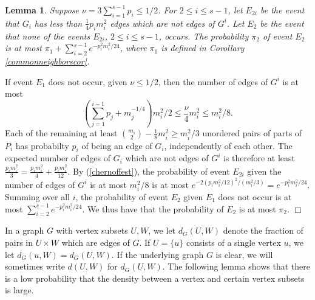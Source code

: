 \documentclass[11pt]{article}
\newtheorem{lemma}{Lemma}[section]
\newenvironment{proof}
      {\medskip\noindent{\bf Proof:}\hspace{1mm}}
      {\hfill$\Box$\medskip}
\begin{document}
\begin{lemma}\label{newedges}
Suppose $\nu= 3\sum_{i=1}^{s-1} p_i \leq 1/2$. For $2 \leq i \leq s-1$, let
$E_{2i}$ be the event that  $G_i$ has less than $\frac{1}{4}p_im_i^2$ edges
which are not edges of $G^i$. Let $E_2$ be the event that none of the events
$E_{2i}$, $2 \leq i \leq s-1$, occurs. The probability $\pi_2$ of event $E_2$
is at most $\pi_1+\sum_{i=2}^{s-1}e^{-p_i^2m_i^2/24}$, where $\pi_1$ is defined
in Corollary \ref{commonneighborscor}.
\end{lemma}
\begin{proof}
If event $E_1$ does not occur, given  $\nu \leq 1/2$, then the number of edges
of $G^i$ is at most $$\left(\sum_{j=1}^{i-1} p_j+m_j^{-1/4}\right)m_i^2/2 \leq
\frac{\nu}{4}m_i^2 \leq m_i^2/8.$$
Each of the remaining at least ${m_i \choose 2}-\frac{1}{8}m_i^2 \geq m_i^2/3$
unordered pairs of parts of  $P_i$ has probabilty $p_i$ of being an edge of
$G_i$, independently of each other. The expected number of edges of $G_i$ which
are not edges of $G^i$ is therefore at least
$\frac{p_im_i^2}{3}=\frac{p_im_i^2}{4}+\frac{p_im_i^2}{12}$. By
(\ref{chernoffest}),  the probability of event $E_{2i}$ given the number of
edges of $G^i$ is at most $m_i^2/8$ is at most
$e^{-2(p_im_i^2/12)^2/(m_i^2/3)}=e^{-p_i^2m_i^2/24}$. Summing over all $i$, the
probability of event $E_2$ given $E_1$ does not occur is at most
$\sum_{i=2}^{s-1}e^{-p_i^2m_i^2/24}$. We thus have that the probability of
$E_2$ is at most $\pi_2$.
\end{proof}


In a graph $G$ with vertex subsets $U,W$, we let $d_G(U,W)$ denote the fraction
of pairs in $U \times W$ which are edges of $G$. If $U=\{u\}$ consists of a
single vertex $u$, we let $d_G(u,W)=d_G(U,W)$. If the underlying graph $G$ is
clear, we will sometimes write $d(U,W)$ for $d_G(U,W)$. The following lemma
shows that there is a low probability that the density between a vertex and
certain vertex subsets is large.
\end{document}
